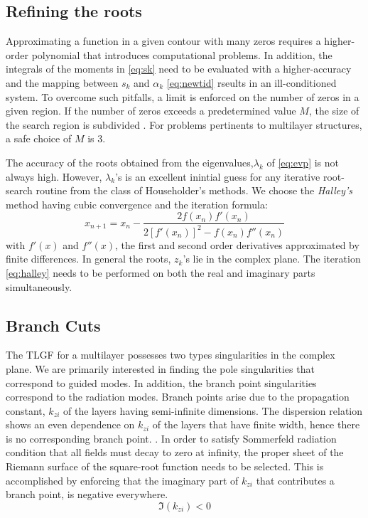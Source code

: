 \documentclass[12pt]{article}
\begin{document}
\subsection*{Refining the roots}
%
Approximating a function in a given contour with many zeros requires a higher-order polynomial that introduces computational problems. In addition, the integrals of the moments in \eqref{eq:sk} need to be evaluated with a higher-accuracy and the mapping between $s_k$ and $\alpha_k$ \eqref{eq:newtid} rseults in an ill-conditioned system. To overcome such pitfalls, a limit is enforced on the number of zeros in a given region. If the number of zeros exceeds a predetermined value $M$, the size of the search region is subdivided \cite{Delves1967c}. For problems pertinents to multilayer structures, a safe choice of $M$ is $3$.

The accuracy of the roots obtained from the eigenvalues,$\lambda_k$ of \eqref{eq:evp} is not always high. However, $\lambda_k$'s is an excellent inintial guess for any iterative root-search routine from the class of Householder's methods. We choose the \emph{Halley's} method having cubic convergence and the iteration formula:
%
\begin{equation}
  x_{n+1} = x_n - \frac {2 f(x_n) f'(x_n)} {2 {[f'(x_n)]}^2 - f(x_n) f''(x_n)}
  \label{eq:halley}
\end{equation}
%
with $f'(x)$ and $f''(x)$, the first and second order derivatives approximated by finite differences. In general the roots, $z_k$'s lie in the complex plane. The iteration \eqref{eq:halley} needs to be performed on both the real and imaginary parts simultaneously.

\subsection*{Branch Cuts}

The TLGF for a multilayer possesses two types singularities in the complex plane. We are primarily interested in finding the pole singularities that correspond to guided modes. In addition, the branch point singularities correspond to the radiation modes. Branch points arise due to the propagation constant, $k_{zi}$ of the layers having semi-infinite dimensions. The dispersion relation shows an even dependence on $k_{zi}$ of the layers that have finite width, hence there is no corresponding branch point.   \cite[Section~5.3a]{felsen1994radiation}. In order to satisfy Sommerfeld radiation condition that all fields must decay to zero at infinity, the proper sheet of the Riemann surface of the square-root function needs to be selected. This is accomplished by enforcing that the imaginary part of $k_{zi}$ that contributes a branch point, is negative everywhere.
%
\begin{equation}
  \Im (k_{zi}) < 0
  \label{eq:proper}
\end{equation}
%








\clearpage %


\end{document}
